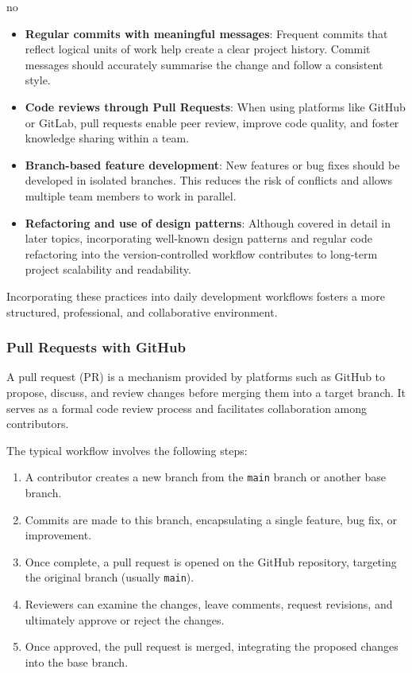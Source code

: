 no\documentclass{article}
\begin{document}
\begin{itemize}
    \item \textbf{Regular commits with meaningful messages}: Frequent commits that reflect logical units of work help create a clear project history. Commit messages should accurately summarise the change and follow a consistent style.
    
    \item \textbf{Code reviews through Pull Requests}: When using platforms like GitHub or GitLab, pull requests enable peer review, improve code quality, and foster knowledge sharing within a team.
    
    \item \textbf{Branch-based feature development}: New features or bug fixes should be developed in isolated branches. This reduces the risk of conflicts and allows multiple team members to work in parallel.
    
    \item \textbf{Refactoring and use of design patterns}: Although covered in detail in later topics, incorporating well-known design patterns and regular code refactoring into the version-controlled workflow contributes to long-term project scalability and readability.
\end{itemize}

Incorporating these practices into daily development workflows fosters a more structured, professional, and collaborative environment.

\subsubsection{Pull Requests with GitHub}

A pull request (PR) is a mechanism provided by platforms such as GitHub to propose, discuss, and review changes before merging them into a target branch. It serves as a formal code review process and facilitates collaboration among contributors.

The typical workflow involves the following steps:

\begin{enumerate}
    \item A contributor creates a new branch from the \texttt{main} branch or another base branch.
    \item Commits are made to this branch, encapsulating a single feature, bug fix, or improvement.
    \item Once complete, a pull request is opened on the GitHub repository, targeting the original branch (usually \texttt{main}).
    \item Reviewers can examine the changes, leave comments, request revisions, and ultimately approve or reject the changes.
    \item Once approved, the pull request is merged, integrating the proposed changes into the base branch.
\end{enumerate}
\end{document}
